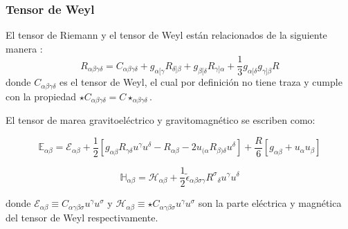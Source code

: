 \documentclass[aspectratio=169,10pt,usenames,dvipsnames,spanish]{beamer}
\begin{document}
\begin{frame}
\frametitle{Tensor de Weyl}
El tensor de Riemann y el tensor de Weyl están relacionados de la siguiente manera \cite{Costa2006}:
\begin{equation}
	R_{\alpha\beta\gamma\delta}=C_{\alpha\beta\gamma\delta}+g_{\alpha[\gamma}R_{\delta]\beta}+g_{\beta[\delta}R_{\gamma]\alpha}+\frac{1}{3}g_{\alpha[\delta}g_{\gamma]\beta}R
\end{equation}
donde $C_{\alpha\beta\gamma\delta}$ es el tensor de Weyl, el cual por definición no tiene traza y cumple con la propiedad $\star C_{\alpha\beta\gamma\delta}=C\star_{\alpha\beta\gamma\delta}$.

El tensor de marea gravitoeléctrico y gravitomagnético se escriben como:

\begin{equation}\label{TensorMareaElectrico_Weyl}
\mathbb{E}_{\alpha\beta}=\mathcal{E}_{\alpha\beta}+\frac{1}{2}[g_{\alpha\beta}R_{\gamma\delta}u^{\gamma}u^{\delta}-R_{\alpha\beta}-2u_{(\alpha}R_{\beta)\delta}u^{\delta}]+\frac{R}{6}[g_{\alpha\beta}+u_{\alpha}u_{\beta}]
\end{equation}

\begin{equation}\label{TensorMareaMagnetico_Weyl}
	\mathbb{H}_{\alpha\beta}=\mathcal{H}_{\alpha\beta}+\frac{1}{2} \tilde{\epsilon}_{\alpha\beta\sigma\gamma}R^{\sigma}{}_{\delta}u^{\gamma}u^{\delta}
\end{equation}

donde $\mathcal{E}_{\alpha\beta}\equiv C_{\alpha\gamma\beta\sigma}u^{\gamma}u^{\sigma}$ y $\mathcal{H}_{\alpha\beta}\equiv \star C_{\alpha\gamma\beta\sigma}u^{\gamma}u^{\sigma}$ son la parte eléctrica y magnética del tensor de Weyl respectivamente.
\end{frame}

\end{document}

